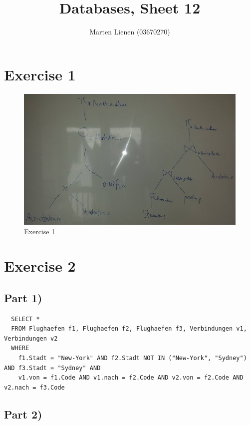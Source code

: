 \documentclass[10pt,a4paper]{article}
\title{Databases, Sheet 12}
\author{Marten Lienen (03670270)}
\begin{document}
\maketitle

\section*{Exercise 1}

\begin{figure}[h]
  \centering
  \includegraphics[width=\textwidth]{sheet-12/exercise-1}
  \caption{Exercise 1}
\end{figure}

\section*{Exercise 2}

\subsection*{Part 1)}

\begin{verbatim}
  SELECT *
  FROM Flughaefen f1, Flughaefen f2, Flughaefen f3, Verbindungen v1, Verbindungen v2
  WHERE
    f1.Stadt = "New-York" AND f2.Stadt NOT IN ("New-York", "Sydney") AND f3.Stadt = "Sydney" AND
    v1.von = f1.Code AND v1.nach = f2.Code AND v2.von = f2.Code AND v2.nach = f3.Code
\end{verbatim}

\subsection*{Part 2)}
\end{document}
